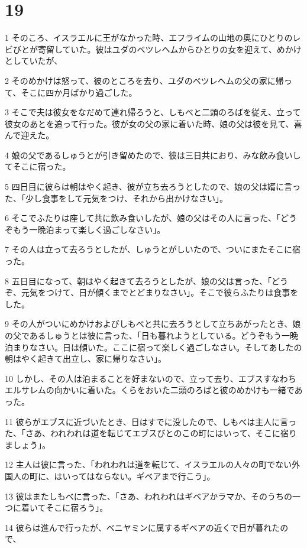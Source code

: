 \chapter{19}

\par 1 そのころ、イスラエルに王がなかった時、エフライムの山地の奥にひとりのレビびとが寄留していた。彼はユダのベツレヘムからひとりの女を迎えて、めかけとしていたが、
\par 2 そのめかけは怒って、彼のところを去り、ユダのベツレヘムの父の家に帰って、そこに四か月ばかり過ごした。
\par 3 そこで夫は彼女をなだめて連れ帰ろうと、しもべと二頭のろばを従え、立って彼女のあとを追って行った。彼が女の父の家に着いた時、娘の父は彼を見て、喜んで迎えた。
\par 4 娘の父であるしゅうとが引き留めたので、彼は三日共におり、みな飲み食いしてそこに宿った。
\par 5 四日目に彼らは朝はやく起き、彼が立ち去ろうとしたので、娘の父は婿に言った、「少し食事をして元気をつけ、それから出かけなさい」。
\par 6 そこでふたりは座して共に飲み食いしたが、娘の父はその人に言った、「どうぞもう一晩泊まって楽しく過ごしなさい」。
\par 7 その人は立って去ろうとしたが、しゅうとがしいたので、ついにまたそこに宿った。
\par 8 五日目になって、朝はやく起きて去ろうとしたが、娘の父は言った、「どうぞ、元気をつけて、日が傾くまでとどまりなさい」。そこで彼らふたりは食事をした。
\par 9 その人がついにめかけおよびしもべと共に去ろうとして立ちあがったとき、娘の父であるしゅうとは彼に言った、「日も暮れようとしている。どうぞもう一晩泊まりなさい。日は傾いた。ここに宿って楽しく過ごしなさい。そしてあしたの朝はやく起きて出立し、家に帰りなさい」。
\par 10 しかし、その人は泊まることを好まないので、立って去り、エブスすなわちエルサレムの向かいに着いた。くらをおいた二頭のろばと彼のめかけも一緒であった。
\par 11 彼らがエブスに近づいたとき、日はすでに没したので、しもべは主人に言った、「さあ、われわれは道を転じてエブスびとのこの町にはいって、そこに宿りましょう」。
\par 12 主人は彼に言った、「われわれは道を転じて、イスラエルの人々の町でない外国人の町に、はいってはならない。ギベアまで行こう」。
\par 13 彼はまたしもべに言った、「さあ、われわれはギベアかラマか、そのうちの一つに着いてそこに宿ろう」。
\par 14 彼らは進んで行ったが、ベニヤミンに属するギベアの近くで日が暮れたので、
